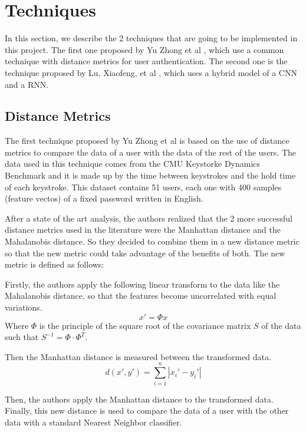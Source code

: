 \section{Techniques}

In this section, we describe the 2 techniques that are going to be implemented in this project. The first one proposed by Yu Zhong et al \cite{combine_distance}, which use a common technique with distance metrics for user authentication. The second one is the technique proposed by Lu, Xiaofeng, et al \cite{deep_learning}, which uses a hybrid model of a CNN and a RNN.

\subsection{Distance Metrics}

The first technique proposed by Yu Zhong et al \cite{combine_distance} is based on the use of distance metrics to compare the data of a user with the data of the rest of the users. The data used in this technique comes from the CMU Keystorke Dynamics Benchmark and it is made up by the time between keystrokes and the hold time of each keystroke. This dataset contains 51 users, each one with 400 samples (feature vectos) of a fixed password written in English.

After a state of the art analysis, the authors realized that the 2 more successful distance metrics used in the literature were the Manhattan distance and the Mahalanobis distance. So they decided to combine them in a new distance metric so that the new metric could take advantage of the benefits of both. The new metric is defined as follows:

Firstly, the authors apply the following linear transform to the data like the Mahalanobis distance, so that the features become uncorrelated with equal variations.
\begin{equation}
	x' = \Phi x
\end{equation}
Where $\Phi$ is the principle of the square root of the covariance matrix $S$ of the data such that $S^{-1} = \Phi \cdot \Phi^T$.

Then the Manhattan distance is measured between the transformed data.
\begin{equation}
	d(x',y') = \sum_{i=1}^{n} |x_i' - y_i'|
\end{equation}

Then, the authors apply the Manhattan distance to the transformed data. Finally, this new distance is used to compare the data of a user with the other data with a standard Nearest Neighbor classifier.

